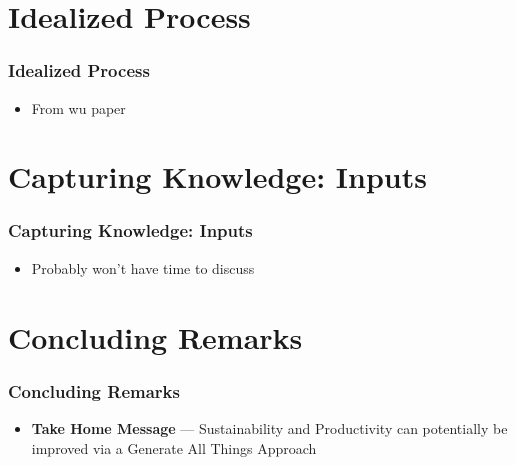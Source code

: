 \documentclass[usenames]{beamer}
\begin{document}
\section[Idealized Process]{Idealized Process}


\begin{frame}

\frametitle{Idealized Process}

\begin{itemize}
\item From wu paper
\end{itemize}

\end{frame}


\section[Inputs]{Capturing Knowledge: Inputs}


\begin{frame}

\frametitle{Capturing Knowledge: Inputs}

\begin{itemize}
\item Probably won't have time to discuss
\end{itemize}

\end{frame}


\section[Concluding Remarks]{Concluding Remarks}


\begin{frame}

\frametitle{Concluding Remarks}

\begin{itemize}
\item \textbf{Take Home Message} --- Sustainability and Productivity can
potentially be improved via a Generate All Things Approach
\end{itemize}

\end{frame}
\end{document}
